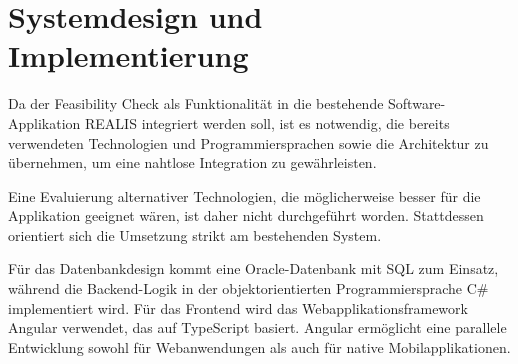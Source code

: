 \chapter{Systemdesign und Implementierung}

Da der Feasibility Check als Funktionalität in die bestehende Software-Applikation \gls{REALIS} integriert werden soll, ist es notwendig, die bereits verwendeten Technologien und Programmiersprachen sowie die Architektur zu übernehmen, um eine nahtlose Integration zu gewährleisten.

Eine Evaluierung alternativer Technologien, die möglicherweise besser für die Applikation geeignet wären, ist daher nicht durchgeführt worden. Stattdessen orientiert sich die Umsetzung strikt am bestehenden System.

Für das Datenbankdesign kommt eine Oracle-Datenbank mit SQL zum Einsatz, während die Backend-Logik in der objektorientierten Programmiersprache C\# implementiert wird. Für das Frontend wird das Webapplikationsframework Angular verwendet, das auf TypeScript basiert. Angular ermöglicht eine parallele Entwicklung sowohl für Web\-anwendungen als auch für native Mobilapplikationen.












